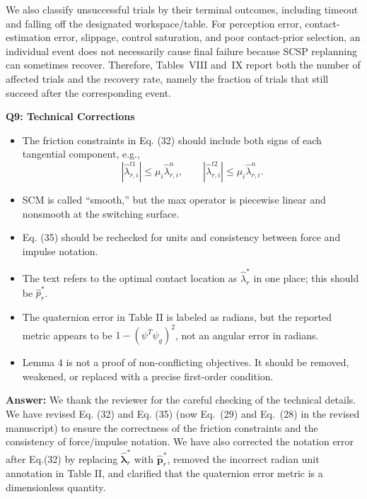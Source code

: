 \documentclass[journal,10pt]{IEEEtran}
\newcommand{\question}[2]{\par\smallskip\noindent
 \color{responseblue}\textbf{Q#1: #2}\par\nobreak\noindent\color{responseblue}}
\newcommand{\answer}{\par\smallskip\noindent\color{black}\textbf{Answer: }\ignorespaces
}
\begin{document}
We also classify unsuccessful trials by their terminal outcomes, including timeout and falling off the designated workspace/table. For perception error, contact-estimation error, slippage, control saturation, and poor contact-prior selection, an individual event does not necessarily cause final failure because SCSP replanning can sometimes recover. Therefore, Tables~VIII and~IX report both the number of affected trials and the recovery rate, namely the fraction of trials that still succeed after the corresponding event.

\question{9}{Technical Corrections}

\begin{itemize}
 \item The friction constraints in Eq. (32) should include both signs of each tangential component, e.g.,
 \begin{equation}
 |\hat{\lambda}_{r,i}^{t1}|\leq\mu_i\hat{\lambda}_{r,i}^{n},
 \qquad
 |\hat{\lambda}_{r,i}^{t2}|\leq\mu_i\hat{\lambda}_{r,i}^{n}.
 \end{equation}
 \item SCM is called ``smooth,'' but the max operator is piecewise linear and nonsmooth at the switching surface.
 \item Eq. (35) should be rechecked for units and consistency between force and impulse notation.
 \item The text refers to the optimal contact location as $\hat{\lambda}_r^*$ in one place; this should be $\hat{p}_r^*$.
 \item The quaternion error in Table II is labeled as radians, but the reported metric appears to be $1-(\psi^T\psi_g)^2$, not an angular error in radians.
 \item Lemma 4 is not a proof of non-conflicting objectives. It should be removed, weakened, or replaced with a precise first-order condition.
\end{itemize}

\answer We thank the reviewer for the careful checking of the technical details. We have revised Eq. (32) and Eq. (35) (now Eq.~(29) and Eq.~(28) in the revised manuscript) to ensure the correctness of the friction constraints and the consistency of force/impulse notation. We have also corrected the notation error after Eq.(32) by replacing $\hat{\boldsymbol{\lambda}}_r^*$ with $\hat{\boldsymbol{p}}_r^*$, removed the incorrect radian unit annotation in Table II, and clarified that the quaternion error metric is a dimensionless quantity.
\end{document}
